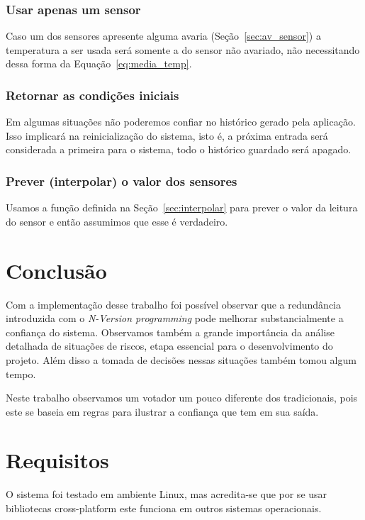 \documentclass[a4paper,10pt]{article}
\begin{document}
\subsubsection{Usar apenas um sensor}\label{ac:falta_sensor}
Caso um dos sensores apresente alguma avaria (Seção~\ref{sec:av_sensor}) a
temperatura a ser usada será somente a do sensor não avariado, não necessitando
dessa forma da Equação~\ref{eq:media_temp}.

\subsubsection{Retornar as condições iniciais}\label{ac:condicoes_iniciais}
Em algumas situações não poderemos confiar no histórico gerado pela
aplicação. Isso implicará na reinicialização do sistema, isto é, a próxima
entrada será considerada a primeira para o sistema, todo o histórico
guardado será apagado.
	
\subsubsection{Prever (interpolar) o valor dos
	sensores}\label{ac:interpolar_sensores}
Usamos a função definida na Seção~\ref{sec:interpolar} para prever o valor da
leitura do sensor e então assumimos que esse é verdadeiro.

\section{Conclusão}
Com a implementação desse trabalho foi possível observar que a redundância
introduzida com o \textit{N-Version programming} pode melhorar substancialmente
a confiança do sistema. Observamos também a grande importância da análise
detalhada de situações de riscos, etapa essencial para o desenvolvimento do
projeto. Além disso a tomada de decisões nessas situações também tomou algum
tempo.

Neste trabalho observamos um votador um pouco diferente dos tradicionais, pois
este se baseia em regras para ilustrar a confiança que tem em sua saída.

\section{Requisitos}

O sistema foi testado em ambiente Linux, mas acredita-se que por se usar bibliotecas
cross-platform este funciona em outros sistemas operacionais.
\end{document}
